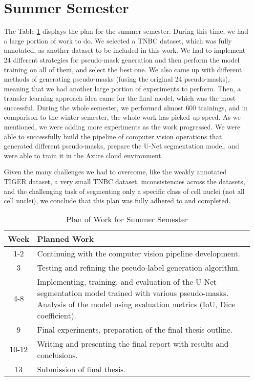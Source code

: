 \section{Summer Semester}
The Table \ref{tab:summer_plan} displays the plan for the summer semester. During this time, we had a large portion of work to do. We selected a TNBC dataset, which was fully annotated, as another dataset to be included in this work. We had to implement 24 different strategies for pseudo-mask generation and then perform the model training on all of them, and select the best one. We also came up with different methods of generating pseudo-masks (fusing the original 24 pseudo-masks), meaning that we had another large portion of experiments to perform. Then, a transfer learning approach idea came for the final model, which was the most successful. During the whole semester, we performed almost 600 trainings, and in comparison to the winter semester, the whole work has picked up speed. As we mentioned, we were adding more experiments as the work progressed. We were able to successfully build the pipeline of computer vision operations that generated different pseudo-masks, prepare the U-Net segmentation model, and were able to train it in the Azure cloud environment. 

Given the many challenges we had to overcome, like the weakly annotated TIGER dataset, a very small TNBC dataset, inconsistencies across the datasets, and the challenging task of segmenting only a specific class of cell nuclei (not all cell nuclei), we conclude that this plan was fully adhered to and completed.

\begin{table}[h!]
\centering
\caption{Plan of Work for Summer Semester}
\begin{tabular}{|c|p{12.5cm}|}
\hline
\textbf{Week} & \textbf{Planned Work} \\ 
\hline
\hline
1-2 & Continuing with the computer vision pipeline development. \\
\hline
3 & Testing and refining the pseudo-label generation algorithm. \\ 
\hline
4-8 & Implementing, training, and evaluation of the U-Net segmentation model trained with various pseudo-masks. Analysis of the model using evaluation metrics (IoU, Dice coefficient). \\ 
\hline
9 & Final experiments, preparation of the final thesis outline. \\ 
\hline
10-12 & Writing and presenting the final report with results and conclusions. \\ 
\hline
13 & Submission of final thesis. \\ 
\hline
\end{tabular}
\label{tab:summer_plan}
\end{table}

